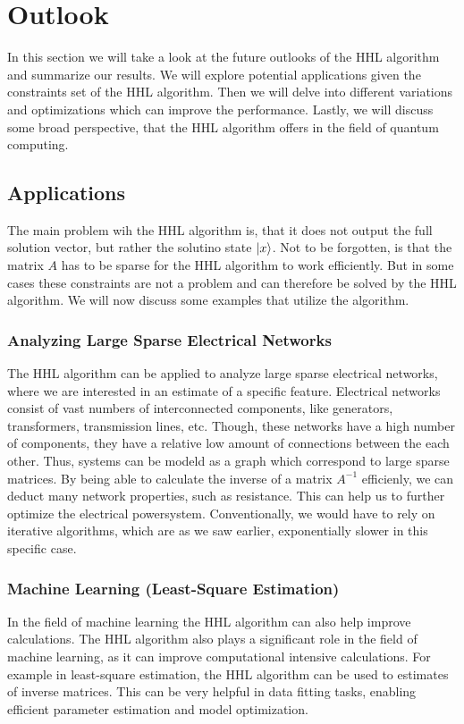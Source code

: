 \section{Outlook} 
In this section we will take a look at the future outlooks of the HHL algorithm and summarize our results.
We will explore potential applications given the constraints set of the HHL algorithm.
Then we will delve into different variations and optimizations which can improve the performance. 
Lastly, we will discuss some broad perspective, that the HHL algorithm offers in the field of quantum computing. 

\subsection{Applications}
The main problem wih the HHL algorithm is, that it does not output the full solution vector, but rather the solutino state $\ket x$.
Not to be forgotten, is that the matrix $A$ has to be sparse for the HHL algorithm to work efficiently.
But in some cases these constraints are not a problem and can therefore be solved by the HHL algorithm.
We will now discuss some examples that utilize the algorithm. 


    \subsubsection{Analyzing Large Sparse Electrical Networks}
    The HHL algorithm can be applied to analyze large sparse electrical networks, where we are interested in an estimate of a specific feature.
    Electrical networks consist of vast numbers of interconnected components, like generators, transformers, transmission lines, etc. 
    Though, these networks have a high number of components, they have a relative low amount of connections between the each other.
    Thus, systems can be modeld as a graph which correspond to large sparse matrices.
    By being able to calculate the inverse of a matrix $A^{-1}$ efficienly, we can deduct many network properties, such as resistance. 
    This can help us to further optimize the electrical powersystem.
    Conventionally, we would have to rely on iterative algorithms, which are as we saw earlier, exponentially slower in this specific case.
    
    \subsubsection{Machine Learning (Least-Square Estimation)}
    In the field of machine learning the HHL algorithm can also help improve calculations. 
    The HHL algorithm also plays a significant role in the field of machine learning, as it can improve computational intensive calculations.
    For example in least-square estimation, the HHL algorithm can be used to estimates of inverse matrices. 
    This can be very helpful in data fitting tasks, enabling efficient parameter estimation and model optimization.
    
